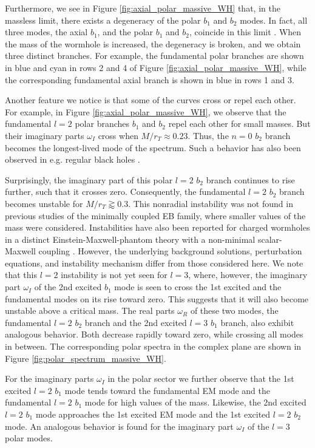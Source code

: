 \documentclass[11pt,a4paper]{article}
\begin{document}
Furthermore, we see in Figure \ref{fig:axial_polar_massive_WH} that, in the massless limit, there exists a degeneracy of the polar $b_1$ and $b_2$ modes. 
In fact, all three modes, the axial $b_1$, and the polar $b_1$ and $b_2$, coincide in this limit \cite{Azad:2022qqn}. 
When the mass of the wormhole is increased, the degeneracy is broken, and we obtain three distinct branches.
For example, the fundamental polar branches are shown in blue and cyan in rows 2 and 4 of Figure \ref{fig:axial_polar_massive_WH}, while the corresponding fundamental axial branch is shown in blue in rows 1 and 3.

Another feature we notice is that some of the curves cross or repel each other. 
For example, in Figure \ref{fig:axial_polar_massive_WH}, we observe that the fundamental $l=2$ polar branches $b_1$ and $b_2$ repel each other for small masses.
But their imaginary parts $\omega_I$ cross when $M/r_T\approx0.23$. 
Thus, the $n=0$ $b_2$ branch becomes the longest-lived mode of the spectrum. 
Such a behavior has also been observed in e.g. regular black holes \cite{Khoo:2025qjc}.

Surprisingly, the imaginary part of this polar $l=2$ $b_2$ branch continues to rise further, such that it crosses zero.
Consequently, the fundamental $l=2$ $b_2$ branch becomes unstable for $M/r_T\gtrapprox 0.3$.
This nonradial instability was not found in previous studies of the minimally coupled EB family, where smaller values of the mass were considered. 
Instabilities have also been reported for charged wormholes in a distinct Einstein-Maxwell-phantom theory with a non-minimal scalar-Maxwell coupling \cite{Wu:2025wlz}.
However, the underlying background solutions, perturbation equations, and instability mechanism differ from those considered here.
We note that this $l=2$ instability is not yet seen for $l=3$, where, however, the imaginary part $\omega_I$ of the 2nd excited $b_1$ mode is seen to cross the 1st excited and the fundamental modes on its rise toward zero.
This suggests that it will also become unstable above a critical mass.
%
The real parts $\omega_R$ of these two modes, the fundamental $l=2$ $b_2$ branch and the 2nd excited $l=3$ $b_1$ branch, also exhibit analogous behavior.
Both decrease rapidly toward zero, while crossing all modes in between.
The corresponding polar spectra in the complex plane are shown in 
Figure \ref{fig:polar_spectrum_massive_WH}.

For the imaginary parts $\omega_I$ in the polar sector we further observe that the 1st excited $l=2$ $b_1$ mode tends toward the fundamental EM mode and the fundamental $l=2$ $b_1$ mode for high values of the mass.  
Likewise, the 2nd excited $l=2$ $b_1$ mode approaches the 1st excited EM mode and the 1st excited $l=2$ $b_2$ mode.
An analogous behavior is found for the imaginary part $\omega_I$ of the $l=3$ polar modes. 
\end{document}
